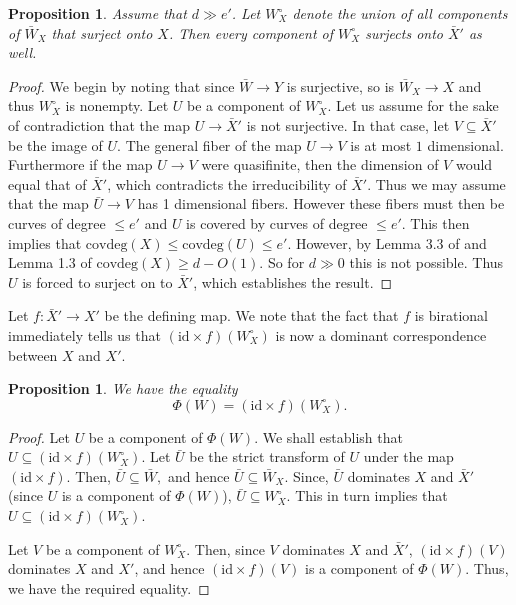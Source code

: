 \documentclass[12pt]{amsart}
\numberwithin{equation}{section}
\newtheorem{proposition}[theorem]{Proposition}
\numberwithin{theorem}{section}
\theoremstyle{definition}
\theoremstyle{definition}
\def\id{{\mathrm{id}}}
\begin{document}
    \begin{proposition}\label{domboth}
        Assume that $d \gg e'$. Let $W_X^{\circ}$ denote the union of all components of $\bar W_X$ that surject onto $X$. Then every component of  $W_X^{\circ}$  surjects onto $\bar X'$ as well.
    \end{proposition}
    \begin{proof}
        We begin by noting that since $ \bar W\to Y$ is surjective, so is $\bar W_X \to X$ and thus $W_X^{\circ}$ is nonempty. Let $U$ be a component of $W_X^{\circ}$. Let us assume for the sake of contradiction that the map $U \to \bar X'$ is not surjective. In that case, let $V \subseteq \bar X'$ be the image of $U$. The general fiber of the map $U \to V$ is at most $1$ dimensional. Furthermore if the map $U \to V$ were quasifinite, then the dimension of $V$ would equal that of $\bar X'$, which contradicts the irreducibility of $\bar X'$. Thus we may assume that the map $\bar U \to V$ has 1 dimensional fibers. However these fibers must then be curves of degree $\le e'$ and $U$ is covered by curves of degree $\le e'$. This then implies that $\textrm{covdeg} (X) \le \textrm{covdeg} (U) \le e'.$ However, by Lemma 3.3  of \cite{LUS} and Lemma 1.3 of \cite{BPELU}  $\textrm{covdeg}(X) \ge d - O(1)$.  So for $d \gg 0$ this is not possible. Thus $U$ is forced to surject on to $\bar X'$, which establishes the result.
    \end{proof}



    Let $f: \bar X' \to X'$ be the defining map. We note that the fact that $f$ is birational immediately tells us  that $(\id \times f)(W_X^{\circ})$ is now a dominant correspondence between $X$ and $X'$. 

        \begin{proposition}
   We have the equality
        $$\Phi(W) = (\id \times f) (W_X^{\circ}).$$
    \end{proposition}

    \begin{proof}
Let $U$ be a component of $\Phi(W).$ We shall establish that $U \subseteq (\id \times f)(W_X^{\circ}).$ Let $\bar U$ be the strict transform of $U$ under the map $(\id \times f)$. Then, $\bar U \subseteq \bar W,$ and hence $\bar U \subseteq \bar W_X.$ Since, $\bar U$ dominates $X$ and $\bar X'$ (since $U$ is a component of $\Phi(W)$), $\bar U \subseteq W_X^{\circ}$. This in turn implies that $U \subseteq (\id \times f)(W_X^{\circ}).$

Let $V$ be a component of $W_X^{\circ}$. Then, since $V$ dominates $X$ and $\bar X'$, $(\id \times f) (V)$ dominates $X$ and $X'$, and hence $(\id \times f) (V)$ is a component of $\Phi(W)$. Thus, we have the required equality.
    \end{proof}
\end{document}
